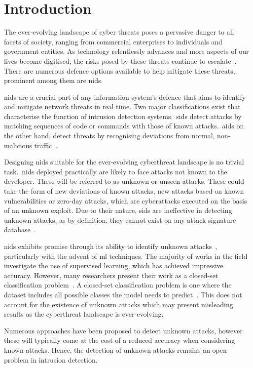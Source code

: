 \chapter{Introduction}%
\label{chp:introduction}

The ever-evolving landscape of cyber threats poses a pervasive danger to all
facets of society, ranging from commercial enterprises to individuals and
government entities. As technology relentlessly advances and more aspects of
our lives become digitised, the risks posed by these threats continue to
escalate~\cite{ENISA}. There are numerous defence options available to help
mitigate these threats, prominent among them are \gls{nids}.

\gls{nids} are a crucial part of any information system's defence that aims to
identify and mitigate network threats in real time. Two major
classifications exist that characterise the function of intrusion detection
systems.\ \gls{sids} detect attacks by matching sequences of code or commands
with those of known attacks.\ \gls{aids} on the other hand, detect threats by
recognising deviations from normal, non-malicious traffic~\cite{survey1}.

Designing \gls{nids} suitable for the ever-evolving cyberthreat landscape is no
trivial task.\ \gls{nids} deployed practically are likely to face attacks not
known to the developer. These will be referred to as unknown or unseen attacks.
These could take the form of new deviations of known attacks, new attacks based
on known vulnerabilities or zero-day attacks, which are cyberattacks executed
on the basis of an unknown exploit. Due to their nature, \gls{sids} are
ineffective in detecting unknown attacks, as by definition, they cannot exist
on any attack signature database~\cite{survey1}.  %

\gls{aids} exhibits promise through its ability to identify unknown
attacks~\cite{aids-unseen}, particularly with the advent of \gls{ml}
techniques. The majority of works in the field investigate
the use of supervised learning, which has achieved impressive accuracy.
However, many researchers present their work as a closed-set classification
problem~\cite{zero-day}. A closed-set classification problem is one where the
dataset includes all possible classes the model needs to predict~\cite{closed-set}. This does not
account for the existence of unknown attacks which may present misleading
results as the cyberthreat landscape is ever-evolving.

Numerous approaches have been proposed to detect unknown attacks, however these
will typically come at the cost of a reduced accuracy when considering known
attacks. Hence, the detection of unknown attacks remains an open problem in
intrusion detection.
